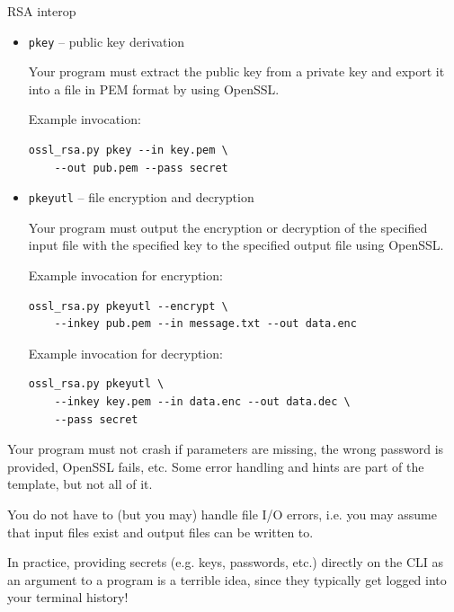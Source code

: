 \documentclass{homework}
\begin{document}
\begin{task}{RSA interop}
\begin{itemize}
    Example invocation:
    \begin{Verbatim}
ossl_rsa.py genpkey --out key.pem --pass secret
    \end{Verbatim}

    \item \texttt{pkey} -- public key derivation
    
    Your program must extract the public key from a private key and export it into a file in PEM format by using OpenSSL.

    Example invocation:
    \begin{Verbatim}
ossl_rsa.py pkey --in key.pem \
    --out pub.pem --pass secret
    \end{Verbatim}

    \item \texttt{pkeyutl} -- file encryption and decryption
    
    Your program must output the encryption or decryption of the specified input file with the specified key to the specified output file using OpenSSL.

    Example invocation for encryption:
    \begin{Verbatim}
ossl_rsa.py pkeyutl --encrypt \
    --inkey pub.pem --in message.txt --out data.enc
    \end{Verbatim}

    Example invocation for decryption:
    \begin{Verbatim}
ossl_rsa.py pkeyutl \
    --inkey key.pem --in data.enc --out data.dec \
    --pass secret
    \end{Verbatim}
  \end{itemize}

  Your program must not crash if parameters are missing, the wrong password is provided, OpenSSL fails, etc.
  Some error handling and hints are part of the template, but not all of it.

  You do not have to (but you may) handle file I/O errors, i.e. you may assume that input files exist and output files can be written to.

  \begin{tcolorbox}[title=Reminder]
    In practice, providing secrets (e.g. keys, passwords, etc.) directly on the CLI as an argument to a program is a terrible idea, since they typically get logged into your terminal history!
  \end{tcolorbox}
\end{task}
\end{document}
